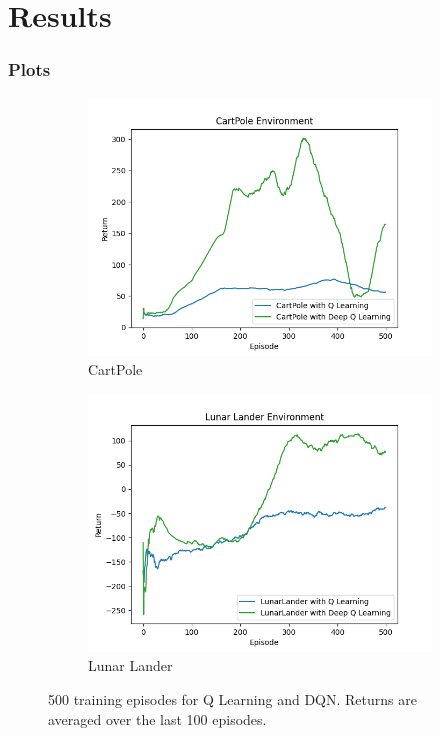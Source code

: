 \documentclass{beamer}
\begin{document}
\section{Results}

\begin{frame}
    \frametitle{Plots}
    \begin{figure}
        \centering
        \begin{subfigure}[H]{0.49\textwidth}
            \centering
            \includegraphics[width=\textwidth]{../plots/cartpole}
            \caption{CartPole}
            \label{fig:cartpole}
        \end{subfigure}
        \begin{subfigure}[H]{0.49\textwidth}
            \centering
            \includegraphics[width=\textwidth]{../plots/lunar}
            \caption{Lunar Lander}
            \label{fig:lunar}
        \end{subfigure}
        \caption{500 training episodes for Q Learning and DQN. Returns are averaged over the last 100 episodes.}
        \label{fig:train}
    \end{figure}

\end{frame}
\end{document}
